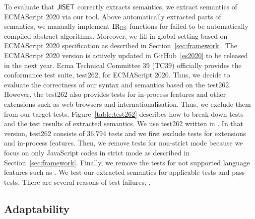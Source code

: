 To evaluate that \( \text{\sf JISET} \) correctly extracts semantics, we extract semantics of ECMAScript
2020 via our tool. Above automatically extracted parts of semantics, we manually implement
 \( \text{IR}_\text{ES} \) functions for failed to be automatically compiled abstract algorithms.
Moreover, we fill in global setting based on ECMAScript 2020 specification as described
in Section~\ref{sec:framework}. The ECMAScript 2020 version is actively updated in
GitHub~\ref{es2020} to be released in the next year. Ecma Technical Committee 39 (TC39)
officially provides the conformance test suite, test262, for ECMAScript 2020.
Thus, we decide to evaluate the correctness of our syntax and semantics based on the test262.
However, the test262 also provides tests for in-process features and other extensions
such as web browsers and internationalisation. Thus, we exclude them from our target tests.
Figure~\ref{table:test262} describes how to break down tests and the test results of extracted
semantics. We use test262 written in . In that version,
test262 consists of 36,794 tests and we first exclude  tests
for extensions and in-process features. Then, we remove tests for non-strict mode because
we focus on only JavaScript codes in strict mode
as described in Section~\ref{sec:framework}. Finally, we remove the  tests
for not supported language features such as .
We test our extracted semantics for  applicable tests and pass  tests.
There are several reasons of test failures; .

\subsection{Adaptability}

